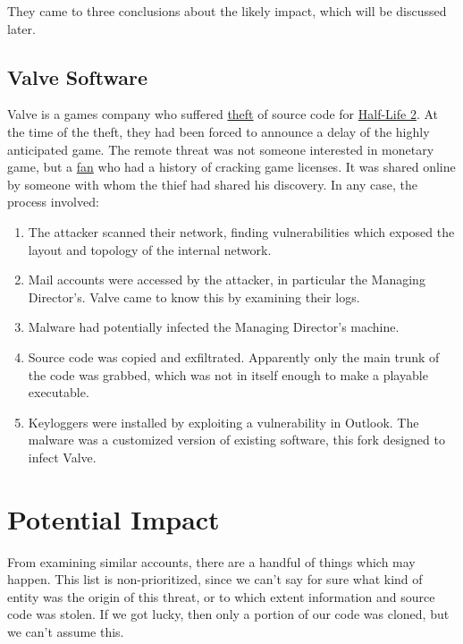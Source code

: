 They came to three conclusions about the likely impact, which will be
discussed later.

\hypertarget{valve-software}{%
\subsection{Valve Software}\label{valve-software}}

Valve is a games company who suffered
\href{https://games.slashdot.org/story/03/10/02/1547218/half-life-2-source-code-leaked}{theft}
of source code for
\href{https://web.archive.org/web/20040828084259/http://www.halflife2.net:80/forums/showthread.php?s=\&threadid=10692}{Half-Life
2}. At the time of the theft, they had been forced to announce a delay
of the highly anticipated game. The remote threat was not someone
interested in monetary game, but a
\href{https://arstechnica.com/gaming/2016/06/what-drove-one-half-life-2-super-fan-to-hack-into-valves-servers/}{fan}
who had a history of cracking game licenses. It was shared online by
someone with whom the thief had shared his discovery. In any case, the
process involved:

\begin{enumerate}
\def\labelenumi{\arabic{enumi}.}
\item
  The attacker scanned their network, finding vulnerabilities which
  exposed the layout and topology of the internal network.
\item
  Mail accounts were accessed by the attacker, in particular the
  Managing Director's. Valve came to know this by examining their logs.
\item
  Malware had potentially infected the Managing Director's machine.
\item
  Source code was copied and exfiltrated. Apparently only the main trunk
  of the code was grabbed, which was not in itself enough to make a
  playable executable.
\item
  Keyloggers were installed by exploiting a vulnerability in Outlook.
  The malware was a customized version of existing software, this fork
  designed to infect Valve.
\end{enumerate}

\hypertarget{potential-impact}{%
\section{Potential Impact}\label{potential-impact}}

From examining similar accounts, there are a handful of things which may
happen. This list is non-prioritized, since we can't say for sure what
kind of entity was the origin of this threat, or to which extent
information and source code was stolen. If we got lucky, then only a
portion of our code was cloned, but we can't assume this.

